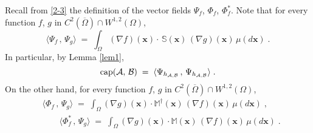 \documentclass[reqno]{amsart}
\newcommand{\mc}[1]{{\mathcal #1}}
\newcommand{\bb}[1]{{\mathbb #1}}
\newcommand{\bs}[1]{{\boldsymbol #1}}
\newcommand{\<}{\langle}
\renewcommand{\>}{\rangle}
\renewcommand{\Cap}{{\rm cap}}
\begin{document}
Recall from \eqref{2-3} the definition of the vector fields $\Psi_f$,
$\Phi_f$, $\Phi^*_f$. Note that for every function $f$, $g$ in
$C^2(\overline{\Omega})\cap W^{1,2}(\Omega)$,
\begin{equation*}
\<\Psi_{f} \,,\, \Psi_{g}\> \;=\; \int_{\Omega} (\nabla f)(\bs{x}) \cdot
\, \bb S (\bs{x}) \, (\nabla g)(\bs{x}) \, \mu(d\bs{x}) \;.
\end{equation*}
In particular, by Lemma \ref{lem1},
\begin{equation}
\label{03}
\Cap (\mc A,\,\mc B) \;=\; \<\Psi_{h_{\mc A,\mc B}} \,,\, \Psi_{h_{\mc A,\mc B}}\> \;.
\end{equation}
On the other hand, for every function $f$, $g$ in
$C^2(\overline{\Omega})\cap W^{1,2}(\Omega)$,
\begin{equation}
\label{04}
\begin{aligned}
& \<\Phi_f \,,\, \Psi_{g}\> \;=\; \int_{\Omega} (\nabla g)(\bs{x})
\cdot \bb M^\dagger (\bs{x}) \,  (\nabla f)(\bs{x}) \, \mu(d\bs{x}) \;, \\
&\qquad \<\Phi^*_f \,,\, \Psi_{g}\> \;=\;
\int_{\Omega} (\nabla g)(\bs{x})  \cdot \bb M (\bs{x}) \,
(\nabla f)(\bs{x}) \, \mu(d\bs{x}) \;.
\end{aligned}
\end{equation}
\end{document}
